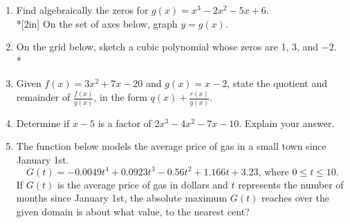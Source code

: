\documentclass[12pt, oneside]{article}
\begin{document}
\begin{enumerate}
\newpage
\item Find algebraically the zeros for  $g(x)=x^3-2x^2-5x+6$.\\*[2in]
On the set of axes below, graph $y=g(x)$.
\begin{center}
\end{center} %

\newpage 

\item On the grid below, sketch a cubic polynomial whose zeros are 1, 3, and $-2$.\\*
\begin{center}
\end{center} %


\newpage
\item Given $f(x)=3x^2+7x-20$ and $g(x)=x-2$, state the quotient and remainder of $\displaystyle \frac{f(x)}{g(x)}$, in the form $\displaystyle q(x)+ \frac{r(x)}{g(x)}$. \\[4in] %

\item Determine if $x-5$ is a factor of $2x^3-4x^2-7x-10$. Explain your answer. %

\newpage

\item The function below models the average price of gas in a small town since January 1st.
\[G(t)=-0.0049t^4 + 0.0923t^3 - 0.56t^2 +1.166t+3.23 \text{, where } 0 \leq t \leq 10.\]
If $G(t)$ is the average price of gas in dollars and $t$ represents the number of months since January 1st, the absolute maximum $G(t)$ reaches over the given domain is about what value, to the nearest cent? \\[3in]%


\end{enumerate}
\end{document}
